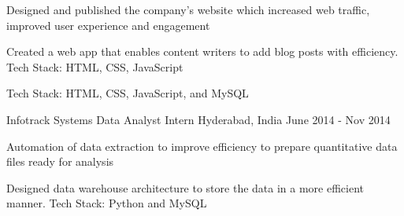 \begin{cventries}
    {
      \begin{cvitems}
        \item {Designed and published the company’s website which increased web traffic, improved user experience and engagement}
        \item {Created a web app that enables content writers to add blog posts with efficiency. Tech Stack: HTML, CSS, JavaScript}
        \item{Tech Stack: HTML, CSS, JavaScript, and MySQL\vspace{-2mm}}
      \end{cvitems}
    }
  \cventry
    {Infotrack Systems}
    {Data Analyst Intern\vspace{-2mm}}
    {Hyderabad, India\vspace{-2mm}}
    {June 2014 - Nov 2014}
    {
      \begin{cvitems}
        \item {Automation of data extraction to improve efficiency to prepare quantitative data files ready for analysis}
        \item {Designed data warehouse architecture to store the data in a more efficient manner. Tech Stack: Python and MySQL}
      \end{cvitems} 
    }
\end{cventries}
